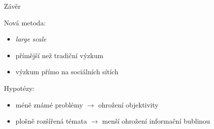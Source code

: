 \documentclass[notheorems,12pt]{beamer}
\begin{document}
\begin{frame}{Závěr}
    \begin{block}{Nová metoda:}
        \begin{itemize}
            \item \textit{large scale}
            \item přímější než tradiční výzkum
            \item výzkum přímo na sociálních sítích
        \end{itemize}
    \end{block}

    \begin{block}{Hypotézy:}
    	\begin{itemize}
            \item méně známé problémy $\rightarrow$ ohrožení objektivity
            \item plošně rozšířená témata $\rightarrow$  menší ohrožení informační bublinou
    	\end{itemize}
    \end{block}
\end{frame}
\end{document}
